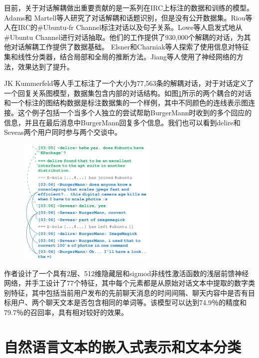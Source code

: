 目前，关于对话解耦做出重要贡献的是一系列在IRC上标注的数据和训练的模型。
Adams和 Martell等人\cite{adams2008topic}研究了对话解耦和话题识别，但是没有公开数据集。Riou等人\cite{riou2015using}在IRC的\#Ubuntu-fr Channel标注对话以及句子关系。Lowe等人\cite{lasecki2013conversations}启发式地从\#Ubuntu Channel进行对话抽取。他们的工作提供了930,000个解耦的对话，为其他对话解耦工作提供了数据基础。
Elsner和Charniak等人\cite{elsner2008you}探索了使用信息对特征集和线性分类器，结合局部和全局的推断方法。Jiang等人\cite{jiang2018learning}使用了神经网络的方法，效果达到了提升。

JK Kummerfeld等人\cite{kummerfeld2018large}手工标注了一个大小为77,563条的解耦对话，对于对话定义了一个回复关系图模型，数据集包含内部的对话结构。如图\ref{fig:example-conversation}所示的两个耦合的对话和一个标注的图结构数据是标注数据集的一个样例，其中不同颜色的连线表示图连接。这个例子包括一个当多个人独立的尝试帮助BurgerMann时收到的多个回应的信息，并且在最后消息中BurgerMann回复多个信息。我们也可以看到delire和Seveas两个用户同时参与两个交谈中。
\begin{figure}[htb]
    \centering
    \includegraphics[width=0.6\textwidth]{Img/example-conversation.png}
    \label{fig:example-conversation}
\end{figure}
作者设计了一个具有2层、512维隐藏层和sigmod非线性激活函数的浅层前馈神经网络，并手工设计了77个特征，其中每个元素都是从原始对话文本中提取的数字类别特征，其中包括当前用户发布的先前聊天消息的时间间隔、聊天内容中是否有目标用户、两个聊天文本是否包含相同的单词等。该模型可以达到74.9％的精度和79.7％的召回率，具有相对较好的效果。

\section{自然语言文本的嵌入式表示和文本分类}
